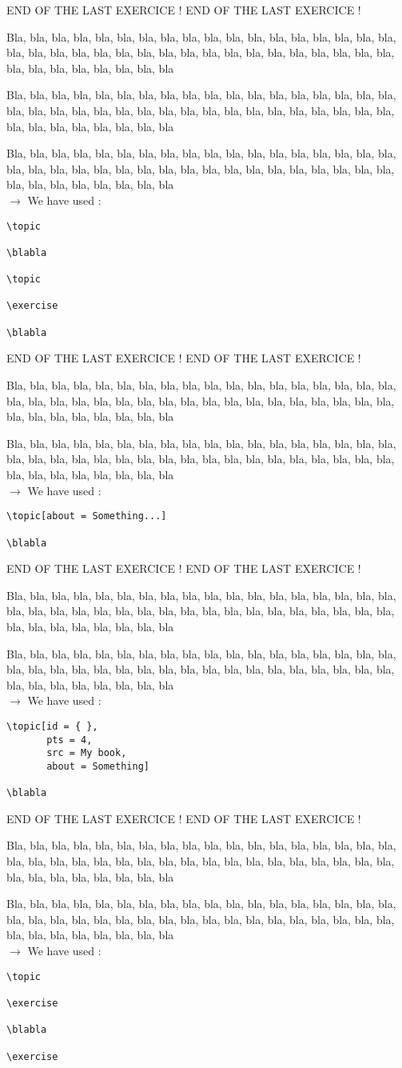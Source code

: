 \documentclass[12pt]{article}
\newcommand\blabla{%
		\noindent Bla, bla, bla, bla, bla, bla, bla, bla, bla, bla, bla,
		bla, bla, bla, bla, bla, bla, bla, bla, bla, bla, bla,
		bla, bla, bla, bla, bla, bla, bla, bla, bla, bla, bla,
		bla, bla, bla, bla, bla, bla, bla, bla, bla, bla, bla
	}
\newcommand\codeused{
		\blabla{} \medskip  \\ \noindent $\rightarrow$ We have used :
	}
\begin{document}
\newpage \medskip \noindent END OF THE LAST EXERCICE ! END OF THE LAST EXERCICE !

\topic

\blabla

\topic

\exercise

\blabla

\codeused{}
\begin{verbatim}
\topic

\blabla

\topic

\exercise

\blabla
\end{verbatim}



\newpage \medskip \noindent END OF THE LAST EXERCICE ! END OF THE LAST EXERCICE !

\topic[about = Something...]

\blabla

\codeused{}
\begin{verbatim}
\topic[about = Something...]

\blabla
\end{verbatim}



\newpage \medskip \noindent END OF THE LAST EXERCICE ! END OF THE LAST EXERCICE !

\topic[id = { }, pts = 4, src = My book, about = Something]

\blabla

\codeused{}
\begin{verbatim}
\topic[id = { }, 
       pts = 4, 
       src = My book, 
       about = Something]

\blabla
\end{verbatim}



\newpage \medskip \noindent END OF THE LAST EXERCICE ! END OF THE LAST EXERCICE !

\topic

\exercise

\blabla

\exercise

\codeused{}
\begin{verbatim}
\topic

\exercise

\blabla

\exercise
\end{verbatim}
\end{document}
